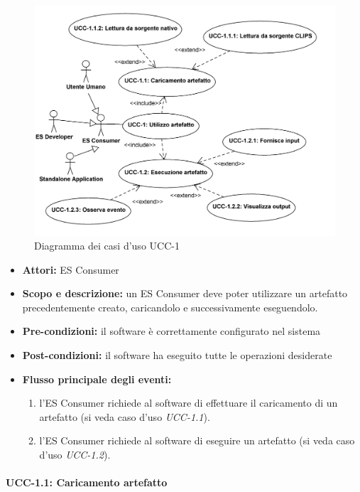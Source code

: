 
\begin{figure}
\centering
\includegraphics[width=1\textwidth]{Immagini/Capitolo2/UseCases/UCC-1.png}
\caption{Diagramma dei casi d'uso UCC-1}\label{fig:uc-ucc-1}
\end{figure}


\begin{itemize}
	\item \textbf{Attori:} ES Consumer
	\item \textbf{Scopo e descrizione:} un ES Consumer deve poter utilizzare un artefatto precedentemente creato, caricandolo e successivamente eseguendolo.
	\item \textbf{Pre-condizioni:} il software è correttamente configurato nel sistema
	\item \textbf{Post-condizioni:} il software ha eseguito tutte le operazioni desiderate
	\item \textbf{Flusso principale degli eventi:}
		\begin{enumerate}
			\item l'ES Consumer richiede al software di effettuare il caricamento di un artefatto (si veda caso d'uso \emph{UCC-1.1}).
			\item l'ES Consumer richiede al software di eseguire un artefatto (si veda caso d'uso \emph{UCC-1.2}).
		\end{enumerate}
\end{itemize}


\paragraph{UCC-1.1: Caricamento artefatto}

